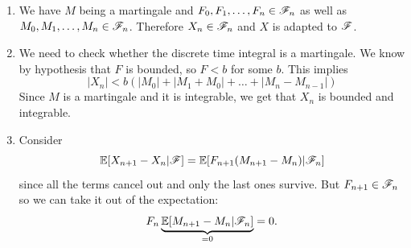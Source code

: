 \documentclass{report}
\begin{document}
\begin{fancyproof}
	\begin{enumerate}
		\item	We have $M$ being a martingale and $F_0,F_1,\ldots,F_n\in\mathscr{F}_{n}$ as well as $M_0,M_1,\ldots,M_{n}\in\mathscr{F}_n$. Therefore $X_{n}\in\mathscr{F}_{n}$ and $X$ is adapted to $\mathscr{F}$.
		\item We need to check whether the discrete time integral is a martingale. We know by hypothesis that $F$ is bounded, so $F<b$ for some $b$. This implies
		\begin{equation*}
			|X_{n}|<b(|M_{0}|+|M_1+M_0|+\ldots+|M_n-M_{n-1}|)
		\end{equation*}
		Since $M$ is a martingale and it is integrable, we get that $X_n$ is bounded and integrable.
		\item Consider
		\begin{equation*}
			\mathbb{E}[X_{n+1}-X_{n}|\mathscr{F}]=\mathbb{E}[F_{n+1}(M_{n+1}-M_{n})|\mathscr{F}_n]
		\end{equation*}
		since all the terms cancel out and only the last ones survive. But $F_{n+1}\in\mathscr{F}_{n}$ so we can take it out of the expectation:
		\[F_{n}\underbrace{\mathbb{E}[M_{n+1}-M_{n}|\mathscr{F}_{n}]}_{=0}=0.\]
	\end{enumerate}
\end{fancyproof}
\end{document}
